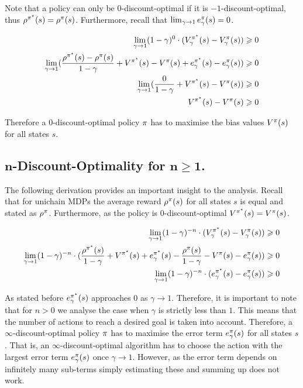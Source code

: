 \documentclass[envcountsame]{llncs}
\begin{document}
Note that a policy can only be \(0\)-discount-optimal if it is \(-1\)-discount-optimal, thus
\(\rho^{\pi^{\star}}(s)=\rho^{\pi}(s)\). Furthermore, recall that
\(\lim_{\gamma \to 1} e_{\gamma}^{\pi}(s) = 0\).


\begin{align*}
  \lim_{\gamma \to 1} (1-\gamma)^{0} \cdot (V_{\gamma}^{\pi^{\star}}(s) - V_{\gamma}^{\pi}(s)) \geqslant 0\\
  \lim_{\gamma \to 1} (\frac{\rho^{\pi^{\star}}(s) - \rho^{\pi}(s)}{1-\gamma} + V^{\pi^{\star}}(s) - V^{\pi}(s) + e_{\gamma}^{\pi^{\star}}(s) - e_{\gamma}^{\pi}(s)) \geqslant 0\\
  \lim_{\gamma \to 1} (\frac{0}{1-\gamma} + V^{\pi^{\star}}(s) - V^{\pi}(s)) \geqslant 0\\
  V^{\pi^{\star}}(s) - V^{\pi}(s) \geqslant 0\\
\end{align*}

Therefore a \(0\)-discount-optimal policy \(\pi\) has to maximise the bias values
\(V^{\pi}(s)\) for all states \(s\).

\vfill
\pagebreak

\subsection{\(\mathbf{n}\)-Discount-Optimality for \(\mathbf{n \geqslant 1}\).}

The following derivation provides an important insight to the analysis. Recall that for unichain
MDPs the average reward \(\rho^{\pi}(s)\) for all states \(s\) is equal and stated as
\(\rho^{\pi}\). Furthermore, as the policy is \(0\)-discount-optimal
\(V^{\pi^{\star}}(s) = V^{\pi}(s)\).


\begin{align*}
  \lim_{\gamma \to 1} (1-\gamma)^{-n} \cdot (V_{\gamma}^{\polopt}(s) - V_{\gamma}^{\pol}(s)) & \geqslant 0\\
  \lim_{\gamma \to 1} (1-\gamma)^{-n} \cdot ( \frac{\avgrew^{\polopt}(s)}{1-\gamma} + V^{\polopt}(s) + e_{\gamma}^{\polopt}(s)  %
  - \frac{\avgrew^{\pol}(s)}{1-\gamma} - V^{\pol}(s) - e_{\gamma}^{\pol}(s) ) & \geqslant 0\\
  \lim_{\gamma \to 1} (1-\gamma)^{-n} \cdot ( e_{\gamma}^{\polopt}(s) - e_{\gamma}^{\pol}(s) ) & \geqslant 0\\
\end{align*}

As stated before \(e_{\gamma}^{\pi^{\star}}(s)\) approaches 0 as \(\gamma \to 1\). Therefore, it is
important to note that for \(n>0\) we analyse the case when \(\gamma\) is strictly less than \(1\). This
means that the number of actions to reach a desired goal is taken into account.
Therefore, a \(\infty\)-discount-optimal policy \(\pi\) has to maximise the error term
$e_{\gamma}^{\pi}(s)$ for all states \(s\). That is, an \(\infty\)-discount-optimal algorithm has to
choose the action with the largest error term \(e_{\gamma}^{\pi}(s)\) once \(\gamma \to 1\).
However, as the error term depends on infinitely many sub-terms simply estimating these and summing
up does not work.
\end{document}
